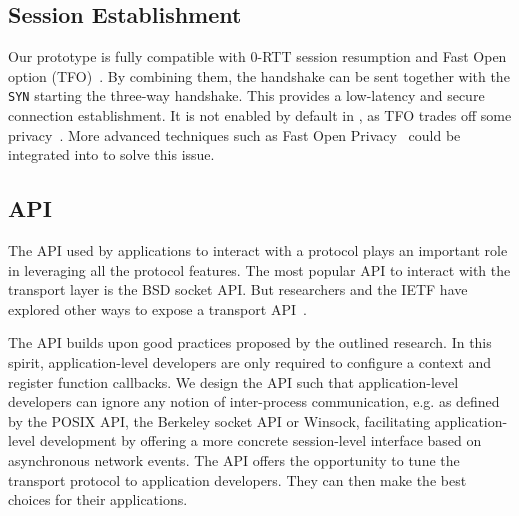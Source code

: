 \subsection{\tcpls Session Establishment}

Our prototype is fully compatible with  0-RTT session resumption
and \tcp Fast Open option (TFO)~\cite{radhakrishnan2011tcp}. By combining them,
the \tcpls handshake can be sent together with the \tcp \texttt{SYN} starting 
the three-way handshake. This provides a low-latency and secure connection establishment.
It is not enabled by default in \tcpls, as TFO trades off some privacy~\cite{sy2020enhanced}.
More advanced techniques such as \tcp Fast Open Privacy~\cite{sy2020enhanced} 
could be
integrated into \tcpls to solve this issue.

\subsection{\tcpls API}
\label{sec-api}

The API used by applications to interact with a protocol plays an important
role in leveraging all the protocol features. The most popular
API to interact with the transport layer is the BSD socket API. 
But researchers and the IETF have explored other ways to expose a transport
API~\cite{draft-ietf-taps-arch,hruby2014sockets,rfc6458,schmidt2013socket}.

The \tcpls API builds upon good practices proposed by the outlined research.
In this spirit, application-level developers are only required to
configure a \tcpls context and register function callbacks.
We design the \tcpls API such
that application-level developers can ignore any notion of inter-process 
communication, e.g. as defined by the POSIX API, the Berkeley socket API or 
Winsock, facilitating application-level development by offering a more concrete
session-level interface based on asynchronous network events.
The \tcpls API offers the opportunity to tune
the transport protocol to application developers. They can then make the best 
choices for their applications.

